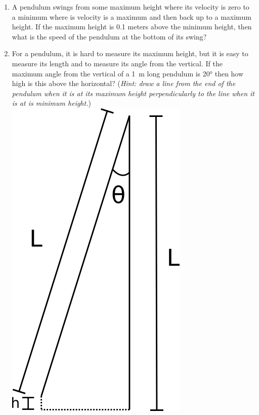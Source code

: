 \begin{enumerate}
\item 
A pendulum swings from some maximum height where its velocity is zero to a minimum where is velocity is a maximum and then back up to a maximum height. If the maximum height is 0.1 meters above the minimum height, then what is the speed of the pendulum at the bottom of its swing?

\item 
For a pendulum, it is hard to measure its maximum height, but it is easy to measure its length and to measure its angle from the vertical. If the maximum angle from the vertical of a \SI{1}{\meter} long pendulum is \ang{20} then how high is this above the horizontal? (\emph{Hint: draw a line from the end of the pendulum when it is at its maximum height perpendicularly to the line when it is at is minimum height.})\\

\includegraphics[]{pendulum-h-l-theta.png} 



\end{enumerate}
